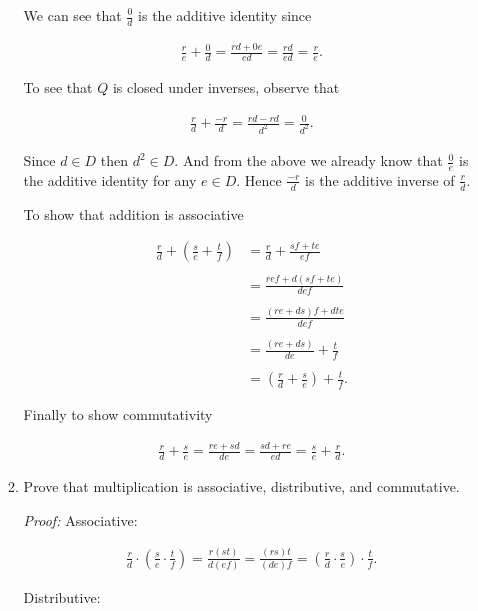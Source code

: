 \documentclass[11pt]{article}
\begin{document}
\begin{enumerate}
\begin{enumerate}
    We can see that $\frac 0 d$ is the additive identity since

    \begin{align*}
      \frac r e + \frac 0 d = \frac{rd+0e}{ed}=\frac{rd}{ed}=\frac r e.
    \end{align*}

    To see that $Q$ is closed under inverses, observe that

    \begin{align*}
      \frac r d + \frac{-r}{d} = \frac{rd-rd}{d^2} = \frac 0 {d^2}.
    \end{align*}

    Since $d\in D$ then $d^2\in D$.  And from the above we already know that $\frac 0 e$ is the additive identity for any $e\in D$.  Hence $\frac{-r}{d}$ is the additive inverse of $\frac r d$.

    To show that addition is associative

    \begin{align*}
      \frac r d + \left(\frac{s}{e}+\frac{t}{f}\right)&= \frac r d + \frac{sf+te}{ef} \\\\
      &= \frac{ref+d(sf+te)}{def}\\\\
      &= \frac{(re+ds)f+dte}{def}\\\\
      &= \frac{(re+ds)}{de}+\frac{t}{f}\\\\
      &= \left(\frac r d +\frac{s}{e}\right)+\frac{t}{f}.
    \end{align*}

    Finally to show commutativity

    \begin{align*}
      \frac r d + \frac{s}{e}=\frac{re+sd}{de}=\frac{sd+re}{ed}=\frac{s}{e}+\frac r d.
    \end{align*}

    \item Prove that multiplication is associative, distributive, and commutative.

    {\it Proof:} Associative:

    \begin{align*}
      \frac r d \cdot \left(\frac s e\cdot \frac t f\right)=\frac{r(st)}{d(ef)}=\frac{(rs)t}{(de)f}=\left(\frac{r}{d}\cdot \frac{s}{e}\right)\cdot \frac{t}{f}.
    \end{align*}

    Distributive:


\end{enumerate}
\end{enumerate}
\end{document}
